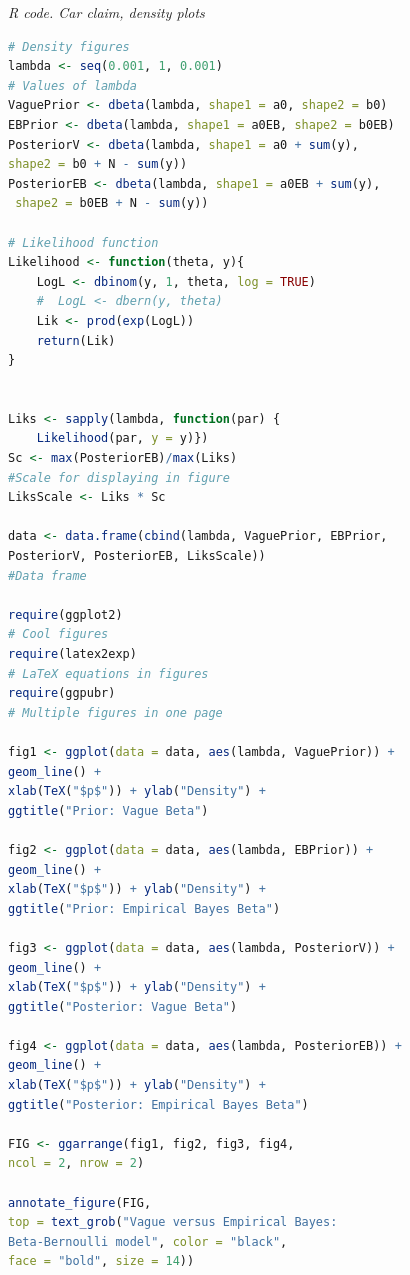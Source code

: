 \begin{enumerate}[leftmargin=*]
\begin{tcolorbox}[enhanced,width=4.67in,center upper,
	fontupper=\large\bfseries,drop shadow southwest,sharp corners]
	\textit{R code. Car claim, density plots}
\begin{VF}
\begin{lstlisting}[basicstyle=\scriptsize, language=R]
# Density figures
lambda <- seq(0.001, 1, 0.001) 
# Values of lambda
VaguePrior <- dbeta(lambda, shape1 = a0, shape2 = b0)
EBPrior <- dbeta(lambda, shape1 = a0EB, shape2 = b0EB)
PosteriorV <- dbeta(lambda, shape1 = a0 + sum(y), 
shape2 = b0 + N - sum(y))
PosteriorEB <- dbeta(lambda, shape1 = a0EB + sum(y),
 shape2 = b0EB + N - sum(y))

# Likelihood function
Likelihood <- function(theta, y){
	LogL <- dbinom(y, 1, theta, log = TRUE)
	#  LogL <- dbern(y, theta)
	Lik <- prod(exp(LogL))
	return(Lik)
}


Liks <- sapply(lambda, function(par) {
	Likelihood(par, y = y)})
Sc <- max(PosteriorEB)/max(Liks) 
#Scale for displaying in figure
LiksScale <- Liks * Sc

data <- data.frame(cbind(lambda, VaguePrior, EBPrior, 
PosteriorV, PosteriorEB, LiksScale)) 
#Data frame

require(ggplot2) 
# Cool figures
require(latex2exp) 
# LaTeX equations in figures
require(ggpubr) 
# Multiple figures in one page

fig1 <- ggplot(data = data, aes(lambda, VaguePrior)) + 
geom_line() +  
xlab(TeX("$p$")) + ylab("Density") +
ggtitle("Prior: Vague Beta") 

fig2 <- ggplot(data = data, aes(lambda, EBPrior)) + 
geom_line() +  
xlab(TeX("$p$")) + ylab("Density") +
ggtitle("Prior: Empirical Bayes Beta")

fig3 <- ggplot(data = data, aes(lambda, PosteriorV)) + 
geom_line() +  
xlab(TeX("$p$")) + ylab("Density") +
ggtitle("Posterior: Vague Beta")

fig4 <- ggplot(data = data, aes(lambda, PosteriorEB)) + 
geom_line() +  
xlab(TeX("$p$")) + ylab("Density") +
ggtitle("Posterior: Empirical Bayes Beta")

FIG <- ggarrange(fig1, fig2, fig3, fig4,
ncol = 2, nrow = 2)

annotate_figure(FIG,
top = text_grob("Vague versus Empirical Bayes: 
Beta-Bernoulli model", color = "black", 
face = "bold", size = 14))
			
\end{lstlisting}
\end{VF}
\end{tcolorbox}


\end{enumerate}
